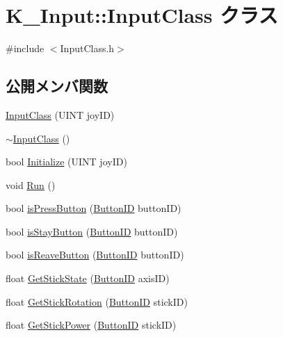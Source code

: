 \hypertarget{class_k___input_1_1_input_class}{}\section{K\+\_\+\+Input\+:\+:Input\+Class クラス}
\label{class_k___input_1_1_input_class}


{\ttfamily \#include $<$Input\+Class.\+h$>$}

\subsection*{公開メンバ関数}
\begin{DoxyCompactItemize}
\item 
\mbox{\hyperlink{class_k___input_1_1_input_class_afa03710c840fdffe3f524c95c0bf5667}{Input\+Class}} (U\+I\+NT joy\+ID)
\item 
\mbox{\hyperlink{class_k___input_1_1_input_class_acf9e81aea0c011250af3d74cbb67098a}{$\sim$\+Input\+Class}} ()
\item 
bool \mbox{\hyperlink{class_k___input_1_1_input_class_aadebe9098c4d5db21c88220150684806}{Initialize}} (U\+I\+NT joy\+ID)
\item 
void \mbox{\hyperlink{class_k___input_1_1_input_class_a62dd64466b14fd1abfb2f1b96e53af4c}{Run}} ()
\item 
bool \mbox{\hyperlink{class_k___input_1_1_input_class_a00bed6537b9106154e2a0d95c5cbcb2a}{is\+Press\+Button}} (\mbox{\hyperlink{namespace_k___input_a2a6df758ee5a36c29d234fe7a27beb2c}{Button\+ID}} button\+ID)
\item 
bool \mbox{\hyperlink{class_k___input_1_1_input_class_a9fe656677b31caed0c4b23b8d22c99ed}{is\+Stay\+Button}} (\mbox{\hyperlink{namespace_k___input_a2a6df758ee5a36c29d234fe7a27beb2c}{Button\+ID}} button\+ID)
\item 
bool \mbox{\hyperlink{class_k___input_1_1_input_class_adbca1b70cc7ff5837aa6a9b8faa49aef}{is\+Reave\+Button}} (\mbox{\hyperlink{namespace_k___input_a2a6df758ee5a36c29d234fe7a27beb2c}{Button\+ID}} button\+ID)
\item 
float \mbox{\hyperlink{class_k___input_1_1_input_class_a332618c400f9270d7d6245cdf5232740}{Get\+Stick\+State}} (\mbox{\hyperlink{namespace_k___input_a2a6df758ee5a36c29d234fe7a27beb2c}{Button\+ID}} axis\+ID)
\item 
float \mbox{\hyperlink{class_k___input_1_1_input_class_a6bd8f3aed49185e3fe2ddb4d3f56856e}{Get\+Stick\+Rotation}} (\mbox{\hyperlink{namespace_k___input_a2a6df758ee5a36c29d234fe7a27beb2c}{Button\+ID}} stick\+ID)
\item 
float \mbox{\hyperlink{class_k___input_1_1_input_class_ae448799432fedd74dcd5d9b307940ca2}{Get\+Stick\+Power}} (\mbox{\hyperlink{namespace_k___input_a2a6df758ee5a36c29d234fe7a27beb2c}{Button\+ID}} stick\+ID)
\end{DoxyCompactItemize}


